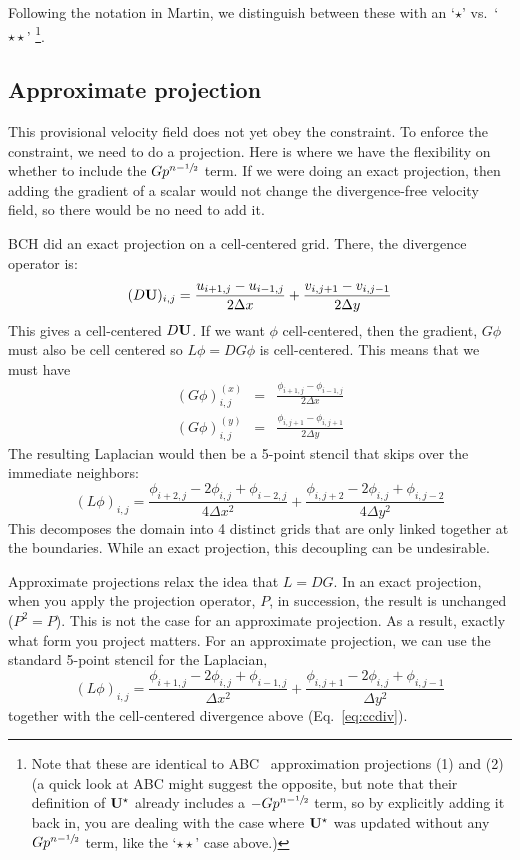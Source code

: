 Following the notation in Martin, we distinguish between these with
an `$\star$' vs.\ `$\star\star$' \footnote{Note that these are identical to
ABC~\cite{ABC} approximation projections (1) and (2) (a quick look at ABC might
suggest the opposite, but note that their definition of ${\bf U}^\star$
already includes a $-Gp^{n-{\sfrac{1}{2}}}$ term, so by explicitly adding it back
in, you are dealing with the case where ${\bf U}^\star$ was updated without
any $Gp^{n-{\sfrac{1}{2}}}$ term, like the `$\star\star$' case above.)}.


\subsection{Approximate projection}

This provisional velocity field does not yet obey the constraint.  To
enforce the constraint, we need to do a projection.  Here is where we
have the flexibility on whether to include the $G p^{n-{\sfrac{1}{2}}}$ term.  If
we were doing an exact projection, then adding the gradient of a
scalar would not change the divergence-free velocity field, so there
would be no need to add it.  

BCH did an exact projection on a cell-centered grid.  There, the
divergence operator is:
\begin{equation}
(D {\bf U})_{i,j} = \frac{u_{i+1,j} - u_{i-1,j}}{2\Delta x} +
              \frac{v_{i,j+1} - v_{i,j-1}}{2\Delta y} \label{eq:ccdiv}
\end{equation}
This gives a cell-centered $D{\bf U}$.  If we want $\phi$ cell-centered, then
the gradient, $G\phi$ must also be cell centered so $L\phi = DG\phi$ is 
cell-centered.  This means that we must have
\begin{eqnarray}
(G\phi)^{(x)}_{i,j} &=& \frac{\phi_{i+1,j} - \phi_{i-1,j}}{2\Delta x} \\
(G\phi)^{(y)}_{i,j} &=& \frac{\phi_{i,j+1} - \phi_{i,j+1}}{2\Delta y}
\end{eqnarray}
The resulting Laplacian would then be a 5-point stencil that skips over
the immediate neighbors:
\begin{equation}
(L\phi)_{i,j} = \frac{\phi_{i+2,j} -2\phi_{i,j} + \phi_{i-2,j}}{4 \Delta x^2} +
    \frac{\phi_{i,j+2} -2\phi_{i,j} + \phi_{i,j-2}}{4 \Delta y^2}
\end{equation}
This decomposes the domain into 4 distinct grids that are only linked 
together at the boundaries.  While an exact projection, this decoupling
can be undesirable.

Approximate projections relax the idea that $L = DG$.  In an exact
projection, when you apply the projection operator, $P$, in
succession, the result is unchanged ($P^2 = P$).  This is not the case
for an approximate projection.  As a result, exactly what form you
project matters.  For an approximate projection, we can use the 
standard 5-point stencil for the Laplacian,
\begin{equation}
(L\phi)_{i,j} = \frac{\phi_{i+1,j} -2\phi_{i,j} + \phi_{i-1,j}}{\Delta x^2} +
    \frac{\phi_{i,j+1} -2\phi_{i,j} + \phi_{i,j-1}}{\Delta y^2}
\end{equation}
together with the cell-centered divergence above (Eq.~\ref{eq:ccdiv}).


